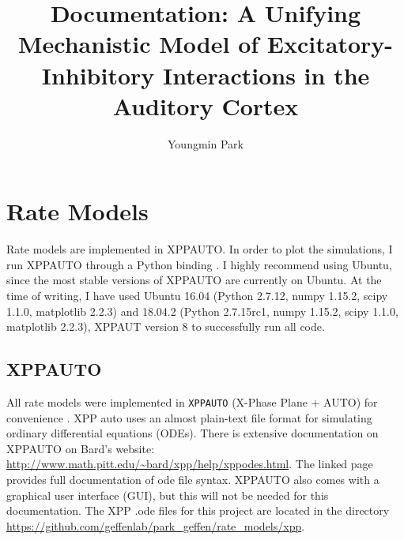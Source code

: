 \documentclass[a4paper,10pt]{article}
\title{Documentation: A Unifying Mechanistic Model of Excitatory-Inhibitory Interactions in the Auditory Cortex}
\author{Youngmin Park}
\begin{document}
\maketitle



\section{Rate Models}

Rate models are implemented in XPPAUTO. In order to plot the simulations, I run XPPAUTO through a Python binding \cite{xppy}. I highly recommend using Ubuntu, since the most stable versions of XPPAUTO are currently on Ubuntu. At the time of writing, I have used Ubuntu 16.04 (Python 2.7.12, numpy 1.15.2, scipy 1.1.0, matplotlib 2.2.3) and 18.04.2 (Python 2.7.15rc1, numpy 1.15.2, scipy 1.1.0, matplotlib 2.2.3), XPPAUT version 8 to successfully run all code.

\subsection{XPPAUTO}
All rate models were implemented in \texttt{XPPAUTO} (X-Phase Plane + AUTO) for convenience \cite{ermentrout2002simulating}. XPP auto uses an almost plain-text file format for simulating ordinary differential equations (ODEs). There is extensive documentation on XPPAUTO on Bard's website:
\url{http://www.math.pitt.edu/~bard/xpp/help/xppodes.html}. The linked page provides full documentation of ode file syntax. XPPAUTO also comes with a graphical user interface (GUI), but this will not be needed for this documentation. The XPP .ode files for this project are located in the directory \url{https://github.com/geffenlab/park_geffen/rate_models/xpp}.
\end{document}
